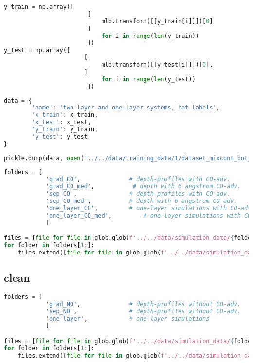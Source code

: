 \begin{lstlisting}[language=Python]
y_train = np.array([    
                        [
                            mlb.transform([[y_train[i]]])[0]
                        ] 
                            for i in range(len(y_train))
                        ])
y_test = np.array([ 
                       [
                            mlb.transform([[y_test[i]]])[0],
                       ] 
                            for i in range(len(y_test))
                        ])
\end{lstlisting}

\begin{lstlisting}[language=Python]
data = {
        'name': 'two-layer and one-layer systems, bot labels',
        'x_train': x_train,
        'x_test': x_test,
        'y_train': y_train,
        'y_test': y_test
}
\end{lstlisting}

\begin{lstlisting}[language=Python]
pickle.dump(data, open('../../data/training_data/1/dataset_mixcont_bot_layer.pkl', 'wb'))
\end{lstlisting}

\begin{lstlisting}[language=Python]
folders = [
            'grad_CO',              # depth-profiles with CO-adv.       with gradient layers
            'grad_CO_med',           # depth with 6 angstrom CO-adv.       with gradient layers
            'sep_CO',               # depth-profiles with CO-adv.       with separated layers
            'sep_CO_med',           # depth with 6 angstrom CO-adv.       with separated layers
            'one_layer_CO',         # one-layer simulations with CO-adv.
            'one_layer_CO_med',         # one-layer simulations with CO-adv.
            ]

files = [file for file in glob.glob(f'../../data/simulation_data/{folders[0]}/*.spc')]
for folder in folders[1:]:
    files.extend([file for file in glob.glob(f'../../data/simulation_data/{folder}/*.spc')])
\end{lstlisting}

\hypertarget{clean}{%
\subsection{clean}\label{clean}}

\begin{lstlisting}[language=Python]
folders = [
            'grad_NO',              # depth-profiles without CO-adv.    with gradient layers
            'sep_NO',               # depth-profiles without CO-adv.    with separated layers
            'one_layer',            # one-layer simulations
            ]

files = [file for file in glob.glob(f'../../data/simulation_data/{folders[0]}/*.spc')]
for folder in folders[1:]:
    files.extend([file for file in glob.glob(f'../../data/simulation_data/{folder}/*.spc')])
\end{lstlisting}

